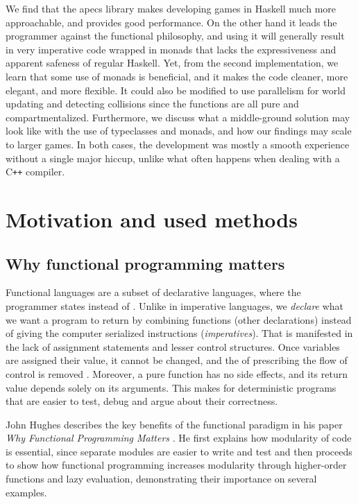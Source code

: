 \documentclass[
  digital, %
  color,   %
  table,   %
  oneside, %
  lof,     %
  lot,     %
]{fithesis3}
\newcommand{\cpp}{C\nolinebreak\texttt{+}\nolinebreak\texttt{+}}
\begin{document}
We find that the apecs library makes developing games
in Haskell much more approachable, and provides good performance.
On the other hand it leads the programmer against the functional philosophy, and using it
will generally result in very imperative code wrapped in monads
that lacks the expressiveness and apparent safeness of regular Haskell.
Yet, from the second implementation, we learn that
some use of monads is beneficial, and it makes the code cleaner, more elegant,
and more flexible. It could also be modified to use parallelism for
world updating and detecting collisions since the functions are all pure and compartmentalized.
Furthermore, we discuss what a middle-ground solution may look like
with the use of typeclasses and monads, and how our findings may scale to larger games.
In both cases, the development was
mostly a smooth experience without a single major hiccup,
unlike what often happens when dealing with a \cpp{} compiler.




\chapter{Motivation and used methods}
\label{chap:motivationandmethods}


\section{Why functional programming matters}
\label{sect:whyfpmatters}

Functional languages are a subset of declarative languages, where the
programmer states  instead of . Unlike in imperative languages,
we \emph{declare} what we want a program to return by combining functions (other declarations)
instead of giving the computer serialized instructions (\emph{imperatives}).
That is manifested in the lack of assignment statements and lesser control structures.
Once variables are assigned their value, it cannot be changed,
and the  of prescribing the flow of control
is removed \cite{whyfpmatters}. Moreover, a pure function has no side effects,
and its return value depends solely on its arguments. This makes for deterministic
programs that are easier to test, debug and argue about their correctness.

John Hughes describes the key benefits of the functional paradigm in his paper
\textit{Why Functional Programming Matters} \cite{whyfpmatters}. He first
explains how modularity of code is essential, since
separate modules are easier to write and test and then proceeds
to show how functional programming increases modularity
through higher-order functions and lazy evaluation, demonstrating
their importance on several examples.
\end{document}
